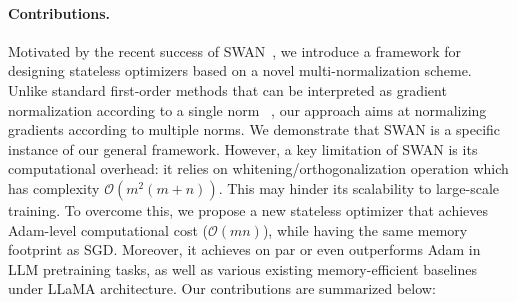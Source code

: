 \paragraph{Contributions.} Motivated by the recent success of SWAN~\cite{ma2024swansgdnormalizationwhitening}, we introduce a framework for designing stateless optimizers based on a novel multi-normalization scheme. Unlike standard first-order methods that can be interpreted as gradient normalization according to a single norm ~\cite{bernstein2024old}, our approach aims at normalizing gradients according to multiple norms. We demonstrate that SWAN is a specific instance of our general framework. However, a key limitation of SWAN is its computational overhead: it relies on whitening/orthogonalization operation which has complexity $\mathcal{O}(m^2(m+n))$. This may hinder its scalability to large-scale training. To overcome this, we propose a new stateless optimizer that achieves Adam-level computational cost ($\mathcal{O}(mn)$), while having the same memory footprint as SGD. Moreover, it achieves on par or even outperforms Adam in LLM pretraining tasks, as well as various existing memory-efficient baselines under LLaMA architecture. Our contributions are summarized below:
